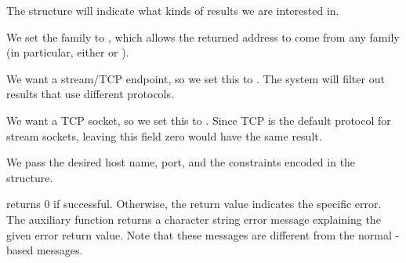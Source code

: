 \begin{topcode}



The  structure will indicate
what kinds of results we are interested in.

\begin{bottomcode}



We set the family to , which allows the returned
address to come from any family (in particular, either
 or ).


We want a stream/TCP endpoint, so we set this to .
The system will filter out results that use different protocols.


We want a TCP socket, so we set this to .
Since TCP is the default protocol for stream sockets, leaving this
field zero would have the same result.

\end{bottomcode}


\begin{bottomcode}



We pass the desired host name, port, and the constraints encoded in
the  structure.


 returns 0 if successful.  Otherwise, the
return value indicates the specific error.
The auxiliary function  returns a character string
error message explaining the given error return value.  Note that
these messages are different from the normal -based messages.

\end{bottomcode}


\end{topcode}
